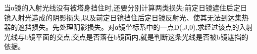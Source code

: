 当α镜的入射光线没有被塔身挡住时,还要分别计算两类损失:前定日镜遮住后定日镜入射光造成的阴影损失,以及前定日镜挡住后定日镜反射光、使其无法到达集热器的遮挡损失。先处理阴影损失。对α镜坐标系中的一点D(,J,0),求经过该点的入射光线与b镜平面的交点;交点是否落在b镜面内,就是判断这条光线是否被b镜遮挡的依据。

